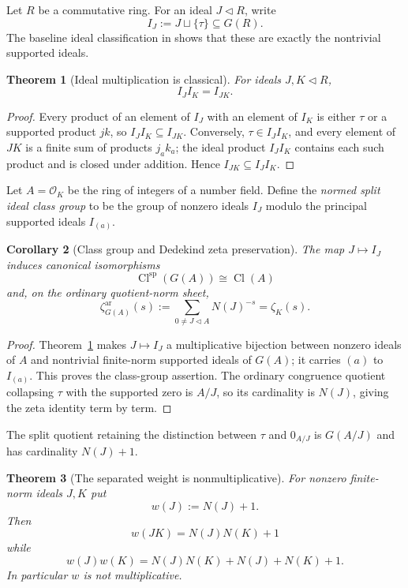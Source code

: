 \documentclass[11pt]{amsart}
\numberwithin{equation}{section}
\newtheorem{theorem}{Theorem}[section]
\newtheorem{corollary}[theorem]{Corollary}
\theoremstyle{definition}
\begin{document}
Let $R$ be a commutative ring.  For an ideal $J\triangleleft R$, write
\[
I_J:=J\sqcup\{\tau\}\subseteq G(R).
\]
The baseline ideal classification in \cite{Globalization,Secondary} shows
that these are exactly the nontrivial supported ideals.

\begin{theorem}[Ideal multiplication is classical]
\label{thm:ideal-multiplication-classical}
For ideals $J,K\triangleleft R$,
\[
I_JI_K=I_{JK}.
\]
\end{theorem}

\begin{proof}
Every product of an element of $I_J$ with an element of $I_K$ is either
$\tau$ or a supported product $jk$, so $I_JI_K\subseteq I_{JK}$.  Conversely,
$\tau\in I_JI_K$, and every element of $JK$ is a finite sum of products
$j_ak_a$; the ideal product $I_JI_K$ contains each such product and is
closed under addition.  Hence $I_{JK}\subseteq I_JI_K$.
\end{proof}

Let $A=\mathcal O_K$ be the ring of integers of a number field.  Define the
\emph{normed split ideal class group} to be the group of nonzero ideals
$I_J$ modulo the principal supported ideals $I_{(a)}$.

\begin{corollary}[Class group and Dedekind zeta preservation]
\label{cor:dedekind-preservation}
The map $J\mapsto I_J$ induces canonical isomorphisms
\[
\operatorname{Cl}^{\mathrm{sp}}(G(A))\cong\operatorname{Cl}(A)
\]
and, on the ordinary quotient-norm sheet,
\[
\zeta^{\mathrm{ar}}_{G(A)}(s)
:=\sum_{0\ne J\triangleleft A}N(J)^{-s}
=\zeta_K(s).
\]
\end{corollary}

\begin{proof}
Theorem~\ref{thm:ideal-multiplication-classical} makes $J\mapsto I_J$ a
multiplicative bijection between nonzero ideals of $A$ and nontrivial
finite-norm supported ideals of $G(A)$; it carries $(a)$ to $I_{(a)}$.
This proves the class-group assertion.  The ordinary congruence quotient
collapsing $\tau$ with the supported zero is $A/J$, so its cardinality is
$N(J)$, giving the zeta identity term by term.
\end{proof}

The split quotient retaining the distinction between $\tau$ and $0_{A/J}$
is $G(A/J)$ and has cardinality $N(J)+1$.

\begin{theorem}[The separated weight is nonmultiplicative]
\label{thm:separated-weight}
For nonzero finite-norm ideals $J,K$ put
\[
w(J):=N(J)+1.
\]
Then
\[
w(JK)=N(J)N(K)+1
\]
while
\[
w(J)w(K)=N(J)N(K)+N(J)+N(K)+1.
\]
In particular $w$ is not multiplicative.
\end{theorem}
\end{document}

